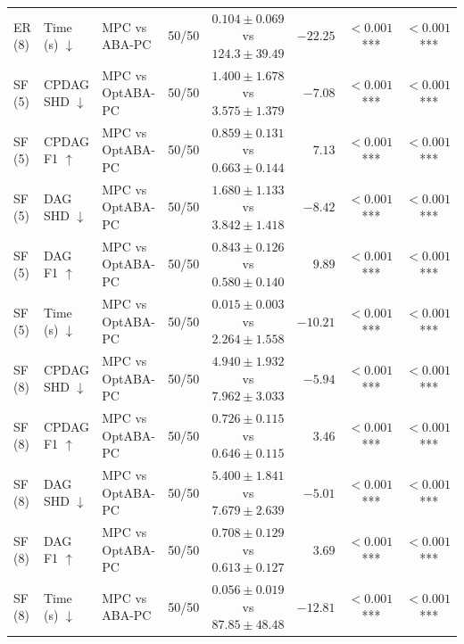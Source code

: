 \begin{table}[t]
{\begin{tabular}{lllrcrcc}
ER (8) & Time (s) $\downarrow$ & MPC vs ABA-PC & 50/50 & $0.104\pm0.069$ vs $124.3\pm39.49$ & $-22.25$ & $<0.001$\,*** & $<0.001$\,***\\
SF (5) & CPDAG SHD $\downarrow$ & MPC vs OptABA-PC & 50/50 & $1.400\pm1.678$ vs $3.575\pm1.379$ & $-7.08$ & $<0.001$\,*** & $<0.001$\,***\\
SF (5) & CPDAG F1 $\uparrow$ & MPC vs OptABA-PC & 50/50 & $0.859\pm0.131$ vs $0.663\pm0.144$ & $7.13$ & $<0.001$\,*** & $<0.001$\,***\\
SF (5) & DAG SHD $\downarrow$ & MPC vs OptABA-PC & 50/50 & $1.680\pm1.133$ vs $3.842\pm1.418$ & $-8.42$ & $<0.001$\,*** & $<0.001$\,***\\
SF (5) & DAG F1 $\uparrow$ & MPC vs OptABA-PC & 50/50 & $0.843\pm0.126$ vs $0.580\pm0.140$ & $9.89$ & $<0.001$\,*** & $<0.001$\,***\\
SF (5) & Time (s) $\downarrow$ & MPC vs OptABA-PC & 50/50 & $0.015\pm0.003$ vs $2.264\pm1.558$ & $-10.21$ & $<0.001$\,*** & $<0.001$\,***\\
SF (8) & CPDAG SHD $\downarrow$ & MPC vs OptABA-PC & 50/50 & $4.940\pm1.932$ vs $7.962\pm3.033$ & $-5.94$ & $<0.001$\,*** & $<0.001$\,***\\
SF (8) & CPDAG F1 $\uparrow$ & MPC vs OptABA-PC & 50/50 & $0.726\pm0.115$ vs $0.646\pm0.115$ & $3.46$ & $<0.001$\,*** & $<0.001$\,***\\
SF (8) & DAG SHD $\downarrow$ & MPC vs OptABA-PC & 50/50 & $5.400\pm1.841$ vs $7.679\pm2.639$ & $-5.01$ & $<0.001$\,*** & $<0.001$\,***\\
SF (8) & DAG F1 $\uparrow$ & MPC vs OptABA-PC & 50/50 & $0.708\pm0.129$ vs $0.613\pm0.127$ & $3.69$ & $<0.001$\,*** & $<0.001$\,***\\
SF (8) & Time (s) $\downarrow$ & MPC vs ABA-PC & 50/50 & $0.056\pm0.019$ vs $87.85\pm48.48$ & $-12.81$ & $<0.001$\,*** & $<0.001$\,***\\
\bottomrule
\end{tabular}%
}
\end{table}

